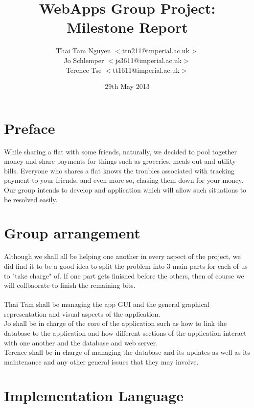 \documentclass[a4paper,9t]{article}
\begin{document}
\title{WebApps Group Project: Milestone Report} \date{29th May
  2013} \author{
  Thai Tam Nguyen $<$ttn211@imperial.ac.uk$>$\\
  Jo Schlemper $<$js3611@imperial.ac.uk$>$\\
  Terence Tse  $<$tt1611@imperial.ac.uk$>$ }
\maketitle
\section*{Preface}
While sharing a flat with some friends, naturally, we decided to pool together money and share payments for things such as groceries, meals out and utility bills. Everyone who shares a flat knows the troubles associated with tracking payment to your friends, and even more so, chasing them down for your money. Our group intends to develop and application which will allow such situations to be resolved easily.

\section*{Group arrangement}
Although we shall all be helping one another in every aspect of the project, we did find it to be a good idea to split the problem into 3 main parts for each of us to "take charge" of. If one part gets finished before the others, then of course we will collbaorate to finish the remaining bits.\\ \\
Thai Tam shall be managing the app GUI and the general graphical representation and visual aspects of the application.\\
Jo shall be in charge of the core of the application such as how to link the database to the application and how different sections of the application interact with one another and the database and web server.\\
Terence shall be in charge of managing the database and its updates as well as its maintenance and any other general issues that they may involve.

\section*{Implementation Language}
\end{document}
